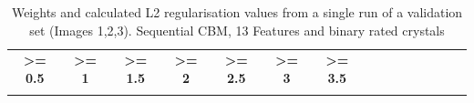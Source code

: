 \begin{landscape}
\begin{table}[H]
{\begin{tabular}{@{}lllllllllllllll@{}}
  \multicolumn{1}{c}{\textbf{\textgreater{}= 0.5}} &
  \multicolumn{1}{c}{\textbf{\textgreater{}= 1}} &
  \multicolumn{1}{c}{\textbf{\textgreater{}= 1.5}} &
  \multicolumn{1}{c}{\textbf{\textgreater{}= 2}} &
  \multicolumn{1}{c}{\textbf{\textgreater{}= 2.5}} &
  \multicolumn{1}{c}{\textbf{\textgreater{}= 3}} &
  \multicolumn{1}{c}{\textbf{\textgreater{}= 3.5}} &
   &
   &
   &
   &
   &
   &
   \\
 &
  \cellcolor[HTML]{FFF2CC} &
  \cellcolor[HTML]{FFD966} &
  \cellcolor[HTML]{FFC409} &
  \cellcolor[HTML]{FCE4D6} &
  \cellcolor[HTML]{F8CBAD} &
  \cellcolor[HTML]{F4B084} &
  \cellcolor[HTML]{F0935A} &
   &
   &
   &
   &
   &
   &
  
\end{tabular}%
}
\caption{Weights and calculated L2 regularisation values from a single run of a validation set (Images 1,2,3). Sequential CBM, 13 Features and binary rated crystals}
\label{Weights and calculated L2 regularisation values from a single run of val set (Images 1,2,3). Sequential CBM, 13 Features and binary rated crystals}
\end{table}
\end{landscape}

